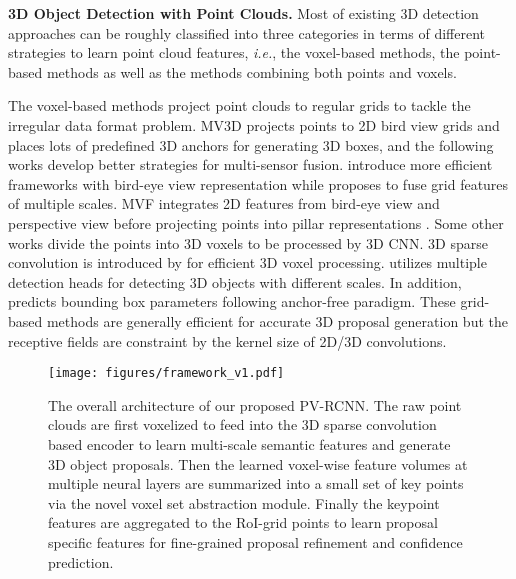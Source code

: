 \documentclass[natbib,twocolumn]{svjour3}          \smartqed  \usepackage{graphicx}
\begin{document}
\noindent
\textbf{3D Object Detection with Point Clouds.}
Most of existing 3D detection approaches can be roughly classified into three categories in terms of different strategies to learn point cloud features, \emph{i.e.}, the voxel-based methods, the point-based methods as well as the methods combining both points and voxels. 

The voxel-based methods project point clouds to regular grids to tackle the irregular data format problem. 
MV3D \citep{Chen2017CVPR} projects points to 2D bird view grids and places lots of predefined 3D anchors for generating 3D boxes, and the following works \citep{ku2018joint,Liang2018ECCV,Liang2019CVPR,vora2020pointpainting,yoo20203d,huang2020epnet} develop better strategies for multi-sensor fusion. \citep{yang2018pixor,Yang2018CoRL,lang2018pointpillars} introduce more efficient frameworks with bird-eye view representation while \citep{ye2020hvnet} proposes to fuse grid features of multiple scales. 
MVF \citep{zhou2020end} integrates 2D features from bird-eye view and perspective view before projecting points into pillar representations \citep{lang2018pointpillars}. 
Some other works \citep{song2016deep,zhou2018voxelnet,wang2022cagroup3d} divide the points into 3D voxels to be processed by 3D CNN. 3D sparse convolution \citep{3DSemanticSegmentationWithSubmanifoldSparseConvNet} is introduced by \citep{yan2018second} for efficient 3D voxel processing.
\citep{wang2019voxelFPN} utilizes multiple detection heads for detecting 3D objects with different scales. In addition, \citep{wang2020pillar,chen2020hotspots} predicts bounding box parameters following anchor-free paradigm. These grid-based methods are generally efficient for accurate 3D proposal generation but the receptive fields are constraint by the kernel size of 2D/3D convolutions.

\begin{figure*}
	\begin{center}
		\texttt{[image: figures/framework\_v1.pdf]}
	\end{center}
\caption{The overall architecture of our proposed PV-RCNN. The raw point clouds are first voxelized to feed into the 3D sparse convolution based encoder to learn multi-scale semantic features and generate 3D object proposals. Then the learned voxel-wise feature volumes at multiple neural layers are summarized into a small set of key points via the novel voxel set abstraction module. Finally the keypoint features are aggregated to the RoI-grid points to learn proposal specific features for fine-grained proposal refinement and confidence prediction.}
	\label{fig:framework_v1}
\end{figure*}
\end{document}
